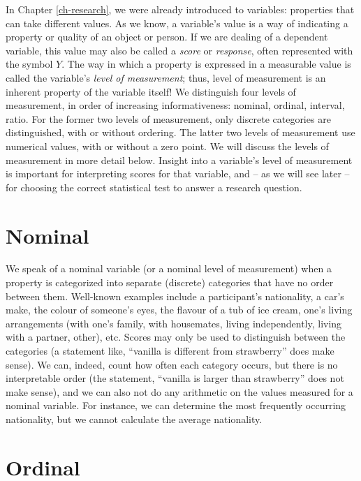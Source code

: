 \documentclass[
]{book}
\begin{document}
In Chapter \ref{ch-research}, we were already introduced to variables: properties that can take different values. As we know, a variable's value is a way of indicating a property or quality of an object or person. If we are dealing of a dependent variable, this value may also be called a \emph{score} or \emph{response}, often represented with the symbol \(Y\). The way in which a property is expressed in a measurable value is called the variable's \emph{level of measurement}; thus, level of measurement is an inherent property of the variable itself! We distinguish four levels of measurement, in order of increasing informativeness: nominal, ordinal, interval, ratio. For the former two levels of measurement, only discrete categories are distinguished, with or without ordering. The latter two levels of measurement use numerical values, with or without a zero point. We will discuss the levels of measurement in more detail below. Insight into a variable's level of measurement is important for interpreting scores for that variable, and -- as we will see later -- for choosing the correct statistical test to answer a research question.

\section{Nominal}\label{sec:nominal}

We speak of a nominal variable (or a nominal level of measurement) when a property is categorized into separate (discrete) categories that have no order between them. Well-known examples include a participant's nationality, a car's make, the colour of someone's eyes, the flavour of a tub of ice cream, one's living arrangements (with one's family, with housemates, living independently, living with a partner, other), etc. Scores may only be used to distinguish between the categories (a statement like, ``vanilla is different from strawberry'' does make sense). We can, indeed, count how often each category occurs, but there is no interpretable order (the statement, ``vanilla is larger than strawberry'' does not make sense), and we can also not do any arithmetic on the values measured for a nominal variable. For instance, we can determine the most frequently occurring nationality, but we cannot calculate the average nationality.

\section{Ordinal}\label{sec:ordinal}
\end{document}
